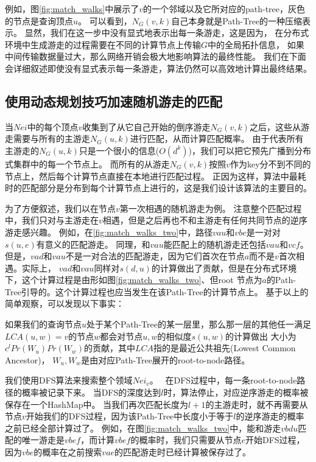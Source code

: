 \documentclass[master]{njuthesis}
\begin{document}
例如，图\ref{fig:match_walks}中展示了$v$的一个邻域以及它所对应的path-tree，灰色的节点是查询顶点$u$。
可以看到，$N_{G}(v, k)$自己本身就是Path-Tree的一种压缩表示。
显然，我们在这一步中没有显式地表示出每一条游走，这是因为，
在分布式环境中生成游走的过程需要在不同的计算节点上传输$G$中的全局拓扑信息，
如果中间传输数据量过大，那么网络开销会极大地影响算法的最终性能。
我们在下面会详细叙述即使没有显式表示每一条游走，算法仍然可以高效地计算出最终结果。

\subsection{使用动态规划技巧加速随机游走的匹配}
当$Nei$中的每个顶点$v$收集到了从它自己开始的倒序游走$N_{G}(v, k)$之后，这些从游走需要与所有的主游走$N_{G}(u, k)$进行匹配，从而计算匹配概率。
由于代表所有主游走的$N_{G}(u, k)$只是一个很小的信息($O(d^k)$)，我们可以把它预先广播到分布式集群中的每一个节点上。
而所有的从游走$N_{G}(v, k)$按照$v$作为key分不到不同的节点上，然后每个计算节点直接在本地进行匹配过程。
正因为这样，算法中最耗时的匹配部分是分布到每个计算节点上进行的，这是我们设计该算法的主要目的。

为了方便叙述，我们以在节点$v$第一次相遇的随机游走为例。
注意整个匹配过程中，我们只对与主游走在$v$相遇，但是之后再也不和主游走有任何共同节点的逆序游走感兴趣。
例如，在\ref{fig:match_walks_two}中，路径$vau$和$vbe$是一对对$s(u,e)$有意义的匹配游走。
同理，和$vau$能匹配上的随机游走还包括$vau$和$vcf$。
但是，$vad$和$vau$不是一对合法的匹配游走，因为它们首次在节点$a$而不是$v$首次相遇。实际上，
$vad$和$vau$同样对$s(d,u)$的计算做出了贡献，但是在分布式环境下，这个计算过程是由形如图\ref{fig:match_walks_two}、但root
节点为$a$的Path-Tree引导的。这个计算过程也应当发生在该Path-Tree的计算节点上。
基于以上的简单观察，可以发现以下事实：
\begin{fact}
如果我们的查询节点$u$处于某个Path-Tree的某一层里，那么那一层的其他任一满足$LCA(u, w)=v$的节点$w$都会对节点$u,w$的相似度$s(u,w)$的计算做出
大小为$c^{l}Pr(W_u)Pr(W_w)$的贡献，其中$LCA$指的是最近公共祖先(Lowest Common Ancestor)，
$W_u, W_w$是由对应Path-Tree展开的root-to-node路径。
\end{fact}
我们使用DFS算法来搜索整个领域$Nei_v$。　
在DFS过程中，每一条root-to-node路径的概率被记录下来。
当DFS的深度达到$l$时，算法停止，对应逆序游走的概率被保存在一个HashMap中。
当我们再次匹配长度为$l+1$的主游走时，就不再需要从节点$v$开始我们的DFS过程，因为该Path-Tree中长度小于等于$l$的逆序游走的概率之前已经全部计算过了。
例如，在图\ref{fig:match_walks_two}中，能和游走$vbdu$匹配的唯一游走是$vbef$，而计算$vbef$的概率时，我们只需要从节点$e$开始DFS过程，
因为$vbe$的概率在之前搜索$vae$的匹配游走时已经计算被保存过了。
\end{document}
